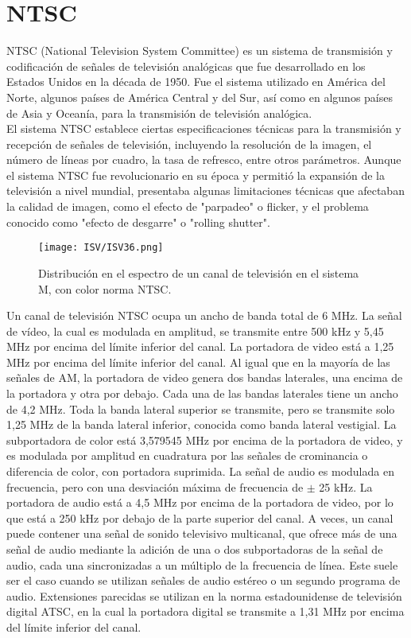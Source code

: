 \documentclass[
	12pt, %
	fleqn, %
	a4paper, %
	oneside, %
]{LegrandOrangeBook}
\begin{document}
\section{NTSC}
NTSC (National Television System Committee) es un sistema de transmisión y codificación de señales de televisión analógicas que fue desarrollado en los Estados Unidos en la década de 1950. Fue el sistema utilizado en América del Norte, algunos países de América Central y del Sur, así como en algunos países de Asia y Oceanía, para la transmisión de televisión analógica.\\
El sistema NTSC establece ciertas especificaciones técnicas para la transmisión y recepción de señales de televisión, incluyendo la resolución de la imagen, el número de líneas por cuadro, la tasa de refresco, entre otros parámetros. Aunque el sistema NTSC fue revolucionario en su época y permitió la expansión de la televisión a nivel mundial, presentaba algunas limitaciones técnicas que afectaban la calidad de imagen, como el efecto de "parpadeo" o flicker, y el problema conocido como "efecto de desgarre" o "rolling shutter".
\begin{figure}[H]
\centering
\texttt{[image: ISV/ISV36.png]}
\caption{Distribución en el espectro de un canal de televisión en el sistema M, con color norma NTSC.}
\end{figure}
Un canal de televisión NTSC ocupa un ancho de banda total de 6 MHz. La señal de vídeo, la cual es modulada en amplitud, se transmite entre 500 kHz y 5,45 MHz por encima del límite inferior del canal. La portadora de video está a 1,25 MHz por encima del límite inferior del canal. Al igual que en la mayoría de las señales de AM, la portadora de video genera dos bandas laterales, una encima de la portadora y otra por debajo. Cada una de las bandas laterales tiene un ancho de 4,2 MHz. Toda la banda lateral superior se transmite, pero se transmite solo 1,25 MHz de la banda lateral inferior, conocida como banda lateral vestigial. La subportadora de color está 3,579545 MHz por encima de la portadora de video, y es modulada por amplitud en cuadratura por las señales de crominancia o diferencia de color, con portadora suprimida. La señal de audio es modulada en frecuencia, pero con una desviación máxima de frecuencia de  $\pm$ 25 kHz. La portadora de audio está a 4,5 MHz por encima de la portadora de video, por lo que está a 250 kHz por debajo de la parte superior del canal. A veces, un canal puede contener una señal de sonido televisivo multicanal, que ofrece más de una señal de audio mediante la adición de una o dos subportadoras de la señal de audio, cada una sincronizadas a un múltiplo de la frecuencia de línea. Este suele ser el caso cuando se utilizan señales de audio estéreo o un segundo programa de audio. Extensiones parecidas se utilizan en la norma estadounidense de televisión digital ATSC, en la cual la portadora digital se transmite a 1,31 MHz por encima del límite inferior del canal.
\end{document}

